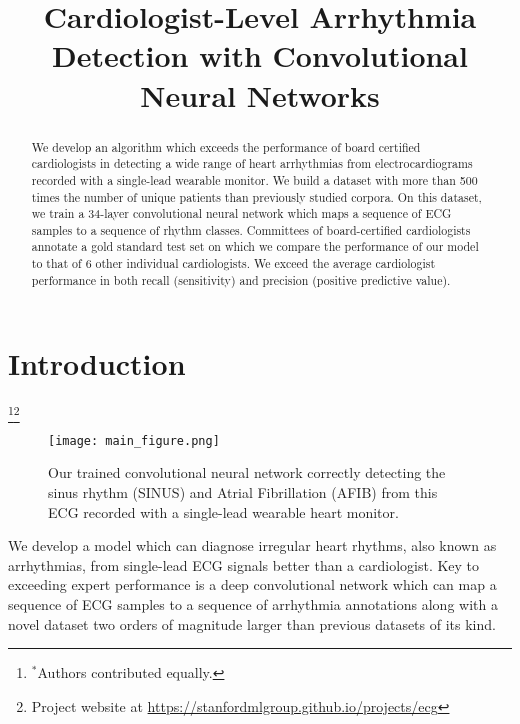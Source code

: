 \documentclass{article}
\title{Cardiologist-Level Arrhythmia Detection with Convolutional Neural Networks}
\begin{document}
 


\begin{abstract} 
We develop an algorithm which exceeds the performance of board certified cardiologists in detecting a wide range of heart arrhythmias from electrocardiograms recorded with a single-lead wearable monitor. We build a dataset with more than 500 times the number of unique patients than previously studied corpora. On this dataset, we train a 34-layer convolutional neural network which maps a sequence of ECG samples to a sequence of rhythm classes. Committees of board-certified cardiologists annotate a gold standard test set on which we compare the performance of our model to that of 6 other individual cardiologists. We exceed the average cardiologist performance in both recall (sensitivity) and precision (positive predictive value).
\end{abstract}

\section{Introduction}{ \let\thefootnote\relax\footnote{$^*$Authors contributed equally.}}{\let\thefootnote\relax\footnote{Project website at \url{https://stanfordmlgroup.github.io/projects/ecg}}}

\begin{figure}[ht]
  \centering
  \texttt{[image: main\_figure.png]}
  \caption{
    Our trained convolutional neural network correctly detecting the sinus rhythm (SINUS) and Atrial Fibrillation (AFIB) from this ECG recorded with a single-lead wearable heart monitor.
  }
  \label{fig:record}
\end{figure}
We develop a model which can diagnose irregular heart rhythms, also known as arrhythmias, from single-lead ECG signals better than a cardiologist. Key to exceeding expert performance is a deep convolutional network which can map a sequence of ECG samples to a sequence of arrhythmia annotations along with a novel dataset two orders of magnitude larger than previous datasets of its kind.
\end{document}
